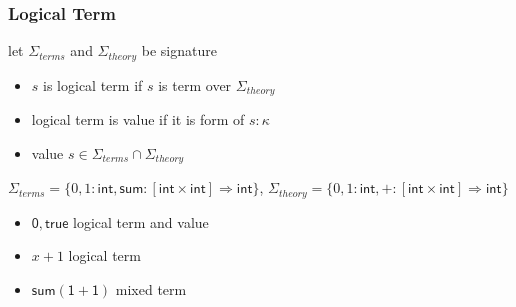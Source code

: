\documentclass[12pt,aspectratio=169]{beamer}
\newcommand{\m}[1]{\mathsf{#1}}
\newcommand{\mi}[1]{\mathit{#1}}
\newcommand{\VV}{\mathcal{V}}
\newcommand{\TT}{\mathcal{T}}
\newcommand{\Terms}{\TT\mathrm{erms}}
\newcommand{\Stheory}{\Sigma_\mi{theory}}
\newcommand{\Sterms}{\Sigma_\mi{terms}}
\begin{document}
\begin{frame}
    \frametitle{Logical Term}

    \begin{definition}
        let $\Sterms$ and $\Stheory$ be signature\\
        \begin{itemize}
            \item $s$ is \alert{logical term} if $s$ is term over $\Stheory$
            \pause
            \item logical term is \alert{value} if it is form of $s : \kappa$
            \pause
            \item value $s \in \Sterms \cap \Stheory$  
        \end{itemize}
    \end{definition}
    \pause
    \begin{example}
        {\small
        $\Sterms = \{0,1 : \m{int}, \m{sum}: [\m{int} \times \m{int}] \Rightarrow \m{int}\}$,
        $\Stheory=\{0,1 : \m{int}, +:[\m{int} \times \m{int}] \Rightarrow \m{int}\}$}
        \pause
        \begin{itemize}
            \item $\m{0},\m{true}$ \quad \pause \alert{logical term and value}
                \pause
            \item $x + 1$ \quad  \pause \alert{logical term}
            \pause 
            \item $\m{sum}{(\m{1} + \m{1})}$ \quad \pause \alert{mixed term}
        \end{itemize}
    \end{example}
\end{frame}
\end{document}

